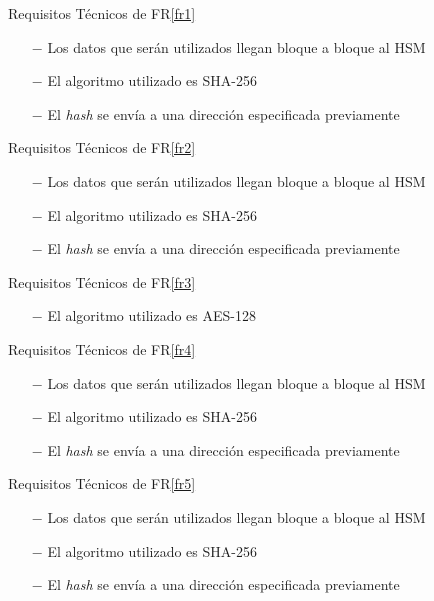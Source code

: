 \documentclass{article}
\begin{document}
    \begin{technical}
      \techrequirement
			{Requisitos Técnicos de FR\ref{fr1}}
			{
      \begin{itemize}
        \item[$-$]{Los datos que serán utilizados llegan bloque a bloque al HSM}
        \item[$-$]{El algoritmo utilizado es SHA-256}
				\item[$-$]{El \textit{hash} se envía a una dirección especificada previamente}
      \end{itemize}
      }
			
      \techrequirement
			{Requisitos Técnicos de FR\ref{fr2}}
      {
      \begin{itemize}
        \item[$-$]{Los datos que serán utilizados llegan bloque a bloque al HSM}
        \item[$-$]{El algoritmo utilizado es SHA-256}
				\item[$-$]{El \textit{hash} se envía a una dirección especificada previamente}
      \end{itemize}
      }
			
			\techrequirement
			{Requisitos Técnicos de FR\ref{fr3}}
      {
      \begin{itemize}
        \item[$-$]{El algoritmo utilizado es AES-128}
      \end{itemize}
      }
			
			\techrequirement
			{Requisitos Técnicos de FR\ref{fr4}}
      {
      \begin{itemize}
        \item[$-$]{Los datos que serán utilizados llegan bloque a bloque al HSM}
        \item[$-$]{El algoritmo utilizado es SHA-256}
				\item[$-$]{El \textit{hash} se envía a una dirección especificada previamente}
      \end{itemize}
      }
			
			\techrequirement
			{Requisitos Técnicos de FR\ref{fr5}}
      {
      \begin{itemize}
        \item[$-$]{Los datos que serán utilizados llegan bloque a bloque al HSM}
        \item[$-$]{El algoritmo utilizado es SHA-256}
				\item[$-$]{El \textit{hash} se envía a una dirección especificada previamente}
      \end{itemize}
      }
			

\end{technical}
\end{document}
